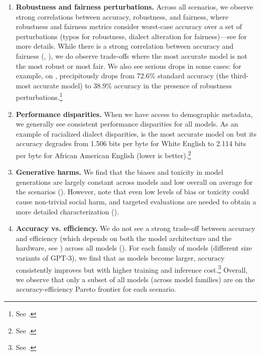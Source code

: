 \begin{enumerate}
    \item \textbf{Robustness and fairness perturbations.}
    Across all scenarios, we observe strong correlations between accuracy, robustness, and fairness, where robustness and fairness metrics consider worst-case accuracy over a set of perturbations (\eg typos for robustness, dialect alteration for fairness)---see  for more details.
     While there is a strong correlation between accuracy and fairness (, ), we do observe trade-offs where the most accurate model is not the most robust or most fair.
    We also see serious drops in some cases: for example, on \narrativeqa, \mtnlgfivethreezero precipitously drops from 72.6\% standard accuracy (\ie the third-most accurate model) to 38.9\% accuracy in the presence of robustness perturbations.\footnote{See .}
    
    \item \textbf{Performance disparities.}
    When we have access to demographic metadata, we generally see consistent performance disparities for all models. 
    As an example of racialized dialect disparities, \optonesevenfive is the most accurate model on \twitteraae but its accuracy degrades from 1.506 bits per byte for White English to 2.114 bits per byte for African American English (lower is better).\footnote{See .}
    
    \item \textbf{Generative harms.}
    We find that the biases and toxicity in model generations are largely constant across models and low overall on average for the \core scenarios ().
    However, note that even low levels of bias or toxicity could cause non-trivial social harm, and targeted evaluations are needed to obtain a more detailed characterization ().
    
    \item \textbf{Accuracy vs. efficiency.}
    We do not see a strong trade-off between accuracy and efficiency (which depends on both the model architecture and the hardware, see ) across all \nummodels models ().
    For each family of models (\eg different size variants of GPT-3), we find that as models become larger, accuracy consistently improves but with higher training and inference cost.\footnote{See .}
    Overall, we observe that only a subset of all models (across model families) are on the accuracy-efficiency Pareto frontier for each scenario.


\end{enumerate}
